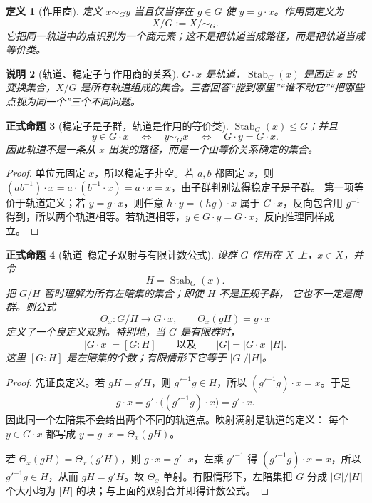 \documentclass[UTF8,fontset=none,a4paper,11pt]{ctexart}
\theoremstyle{foundation-definition}
\newtheorem{definition}{定义}[section]
\theoremstyle{foundation-theorem}
\theoremstyle{foundation-proposition}
\newtheorem{proposition}[definition]{正式命题}
\theoremstyle{foundation-example}
\theoremstyle{foundation-remark}
\newtheorem{remark}[definition]{说明}
\theoremstyle{foundation-theorem}
\begin{document}
\begin{definition}[作用商]\label{def:action-quotient}
定义 \(x\sim_G y\) 当且仅当存在 \(g\in G\) 使 \(y=g\cdot x\)。作用商定义为
\[
X/G:=X/{\sim_G}.
\]
它把同一轨道中的点识别为一个商元素；这不是把轨道当成路径，而是把轨道当成等价类。
\end{definition}

\begin{remark}[轨道、稳定子与作用商的关系]
\(G\cdot x\) 是轨道，\(\operatorname{Stab}_G(x)\) 是固定 \(x\) 的变换集合，\(X/G\) 是所有轨道组成的集合。三者回答“能到哪里”“谁不动它”“把哪些点视为同一个”三个不同问题。
\end{remark}

\begin{proposition}[稳定子是子群，轨道是作用的等价类]
\(\operatorname{Stab}_G(x)\leq G\)；并且
\[
y\in G\cdot x\quad\Longleftrightarrow\quad y\sim_G x
\quad\Longleftrightarrow\quad G\cdot y=G\cdot x.
\]
因此轨道不是一条从 \(x\) 出发的路径，而是一个由等价关系确定的集合。
\end{proposition}

\begin{proof}
单位元固定 \(x\)，所以稳定子非空。若 \(a,b\) 都固定 \(x\)，则
\((ab^{-1})\cdot x=a\cdot(b^{-1}\cdot x)=a\cdot x=x\)，由子群判别法得稳定子是子群。
第一项等价于轨道定义；若 \(y=g\cdot x\)，则任意 \(h\cdot y=(hg)\cdot x\) 属于
\(G\cdot x\)，反向包含用 \(g^{-1}\) 得到，所以两个轨道相等。若轨道相等，\(y\in G\cdot y=G\cdot x\)，反向推理同样成立。
\end{proof}

\begin{proposition}[轨道--稳定子双射与有限计数公式]
\label{prop:orbit-stabilizer-bijection}
设群 \(G\) 作用在 \(X\) 上，\(x\in X\)，并令
\[
H=\operatorname{Stab}_G(x).
\]
把 \(G/H\) 暂时理解为所有左陪集的集合；即使 \(H\) 不是正规子群，
它也不一定是商群。则公式
\[
\Theta_x:G/H\longrightarrow G\cdot x,\qquad
\Theta_x(gH)=g\cdot x
\]
定义了一个良定义双射。特别地，当 \(G\) 是有限群时，
\[
|G\cdot x|=[G:H]
\qquad\text{以及}\qquad
|G|=|G\cdot x|\,|H|.
\]
这里 \([G:H]\) 是左陪集的个数；有限情形下它等于
\(|G|/|H|\)。
\end{proposition}

\begin{proof}
先证良定义。若 \(gH=g'H\)，则 \(g'^{-1}g\in H\)，所以
\((g'^{-1}g)\cdot x=x\)。于是
\[
g\cdot x=g'\cdot\bigl((g'^{-1}g)\cdot x\bigr)=g'\cdot x.
\]
因此同一个左陪集不会给出两个不同的轨道点。映射满射是轨道的定义：
每个 \(y\in G\cdot x\) 都写成 \(y=g\cdot x=\Theta_x(gH)\)。

若 \(\Theta_x(gH)=\Theta_x(g'H)\)，则 \(g\cdot x=g'\cdot x\)，左乘
\(g'^{-1}\) 得 \((g'^{-1}g)\cdot x=x\)，所以 \(g'^{-1}g\in H\)，从而
\(gH=g'H\)。故 \(\Theta_x\) 单射。有限情形下，左陪集把 \(G\) 分成
\(|G|/|H|\) 个大小均为 \(|H|\) 的块；与上面的双射合并即得计数公式。
\end{proof}
\end{document}
